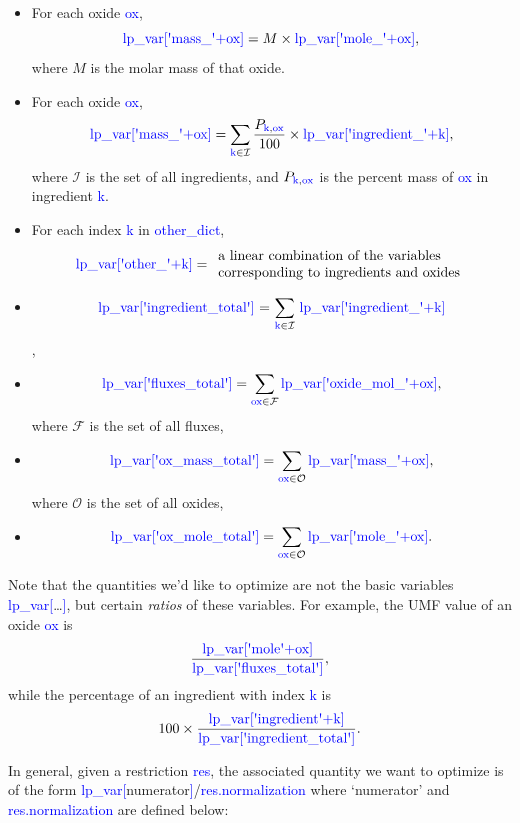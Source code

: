 \documentclass[a4paper,10pt]{article}
\def\'{\textquotesingle}
\def\blue{\textcolor{blue}}
\def\lpv{lp\_var}
\begin{document}
\begin{itemize}
\item For each oxide \blue{ox}, 
$$\textnormal{\blue{\lpv[\'mass\_\'+ox]}} = M\times \blue{\textnormal{\lpv[\'mole\_\'+ox]}},$$
where $M$ is the molar mass of that oxide.
\item For each oxide \blue{ox}, 
$$\textnormal{\blue{\lpv[\'mass\_\'+ox]}} = \sum_{\textnormal{\blue{k}}\in\mathcal{I}} \frac{P_{\textnormal{\blue{k},\blue{ox}}}}{100} \times \textnormal{\blue{\lpv[\'ingredient\_\'+k]}},$$ 
where $\mathcal{I}$ is the set of all ingredients, and $P_{\blue{\textnormal{k}},\blue{\textnormal{ox}}}$ is the percent mass of \blue{ox} in ingredient \blue{k}.
\item For each index \blue{k} in \blue{other\_dict}, 
$$\textnormal{\blue{\lpv[\'other\_\'+k]}} = \begin{array}{l}\textnormal{a linear combination of the variables}\\
\textnormal{corresponding to ingredients and oxides}
\end{array}$$ 
\item $$\textnormal{\blue{\lpv[\'ingredient\_total\']} = $\sum_{\textnormal{\blue{k}}\in\mathcal{I}}$ \blue{\lpv[\'ingredient\_\'+k]}}$$, 
\item $$\textnormal{\blue{\lpv[\'fluxes\_total\']}} = \sum_{\blue{\textnormal{ox}}\in \mathcal{F}} \textnormal{\blue{\lpv[\'oxide\_mol\_\'+ox]}},$$ 
where $\mathcal{F}$ is the set of all fluxes, 
\item $$\textnormal{\blue{\lpv[\'ox\_mass\_total\']}} = \sum_{\blue{\textnormal{ox}}\in \mathcal{O}} \textnormal{\blue{\lpv[\'mass\_\'+ox]}},$$ where $\mathcal{O}$ is the set of all oxides,  
\item $$\textnormal{\blue{\lpv[\'ox\_mole\_total\']}} = \sum_{\blue{\textnormal{ox}}\in \mathcal{O}} \textnormal{\blue{\lpv[\'mole\_\'+ox]}}.$$
\end{itemize}

Note that the quantities we'd like to optimize are not the basic variables \blue{\lpv[}\ldots\blue{]}, but certain \emph{ratios} of these variables. For example, the UMF value of an oxide \blue{ox} is $$\frac{\textnormal{\blue{\lpv[\'mole\'+ox]}}}{\textnormal{\blue{\lpv[\'fluxes\_total\']}}},$$ 
while the percentage of an ingredient with index \blue{k} is $$100\times\frac{\textnormal{\blue{\lpv[\'ingredient\'+k]}}}{\textnormal{\blue{\lpv[\'ingredient\_total\']}}}.$$

In general, given a restriction \blue{res}, the associated quantity we want to optimize is of the form \blue{\lpv[}numerator\blue{]}/\blue{res.normalization} where `numerator' and \blue{res.normalization} are defined below:
\end{document}
